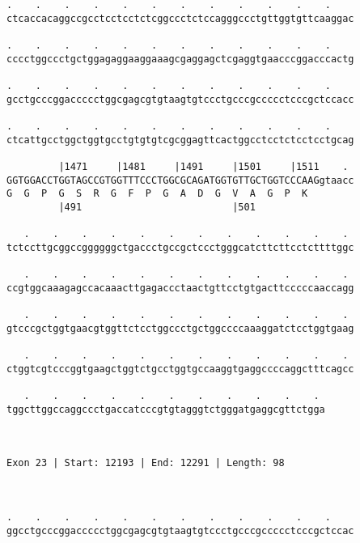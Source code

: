 \documentclass{article}
\begin{document}
\begin{Verbatim}
.    .    .    .    .    .    .    .    .    .    .    .    
ctcaccacaggccgcctcctcctctcggccctctccagggccctgttggtgttcaaggac
                                                            
.    .    .    .    .    .    .    .    .    .    .    .    
cccctggccctgctggagaggaaggaaagcgaggagctcgaggtgaacccggacccactg
                                                            
.    .    .    .    .    .    .    .    .    .    .    .    
gcctgcccggaccccctggcgagcgtgtaagtgtccctgcccgccccctcccgctccacc
                                                            
.    .    .    .    .    .    .    .    .    .    .    .    
ctcattgcctggctggtgcctgtgtgtcgcggagttcactggcctcctctcctcctgcag
                                                            
         |1471     |1481     |1491     |1501     |1511    . 
GGTGGACCTGGTAGCCGTGGTTTCCCTGGCGCAGATGGTGTTGCTGGTCCCAAGgtaacc
G  G  P  G  S  R  G  F  P  G  A  D  G  V  A  G  P  K        
         |491                          |501                 
  
   .    .    .    .    .    .    .    .    .    .    .    . 
tctccttgcggccggggggctgaccctgccgctccctgggcatcttcttcctcttttggc
                                                            
   .    .    .    .    .    .    .    .    .    .    .    . 
ccgtggcaaagagccacaaacttgagaccctaactgttcctgtgacttcccccaaccagg
                                                            
   .    .    .    .    .    .    .    .    .    .    .    . 
gtcccgctggtgaacgtggttctcctggccctgctggccccaaaggatctcctggtgaag
                                                            
   .    .    .    .    .    .    .    .    .    .    .    . 
ctggtcgtcccggtgaagctggtctgcctggtgccaaggtgaggccccaggctttcagcc
                                                            
   .    .    .    .    .    .    .    .    .    .    . 
tggcttggccaggccctgaccatcccgtgtagggtctgggatgaggcgttctgga
                                                       
                                                       
 
Exon 23 | Start: 12193 | End: 12291 | Length: 98



.    .    .    .    .    .    .    .    .    .    .    .    
ggcctgcccggaccccctggcgagcgtgtaagtgtccctgcccgccccctcccgctccac
                                                            

\end{Verbatim}
\end{document}
